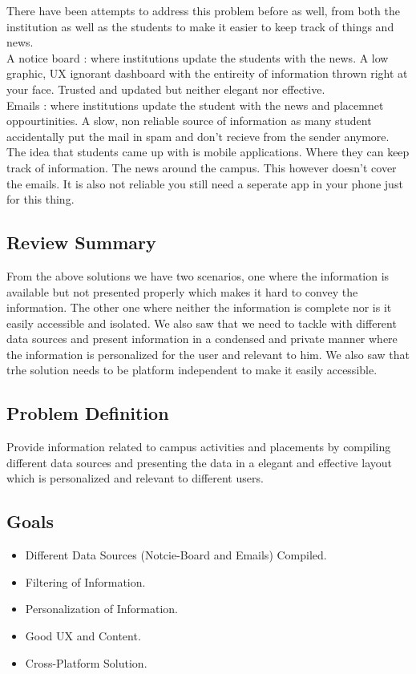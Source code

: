 \documentclass[14pt]{extarticle}
\begin{document}
There have been attempts to address this problem before as well, from both the institution as well as the students to make it easier to keep track of things and news.  \\

A notice board : where institutions update the students with the news. A low graphic, UX ignorant dashboard with the entireity of information thrown right at your face. Trusted and updated but neither elegant nor effective. \\
Emails : where institutions update the student with the news and placemnet oppourtinities. A slow, non reliable source of information as many student accidentally put the mail in spam and don't recieve from the sender anymore. \\

The idea that students came up with is mobile applications. Where they can keep track of information. The news around the campus. This however doesn't cover the emails. It is also not reliable you still need a seperate app in your phone just for this thing.

\subsection{Review Summary}

From the above solutions we have two scenarios, one where the information is available but not presented properly which makes it hard to convey the information. The other one where neither the information is complete nor is it easily accessible and isolated. We also saw that we need to tackle with different data sources and present information in a condensed and private manner where the information is personalized for the user and relevant to him. We also saw that trhe solution needs to be platform independent to make it easily accessible.
\subsection{Problem Definition}

Provide information related to campus activities and placements by compiling different data sources and presenting the data in a elegant and effective layout which is personalized and relevant to different users.
\subsection{Goals}

\begin{itemize}
    \item Different Data Sources (Notcie-Board and Emails) Compiled.
    \item Filtering of Information.
    \item Personalization of Information.
    \item Good UX and Content.
    \item Cross-Platform Solution.
\end{itemize}
\end{document}
